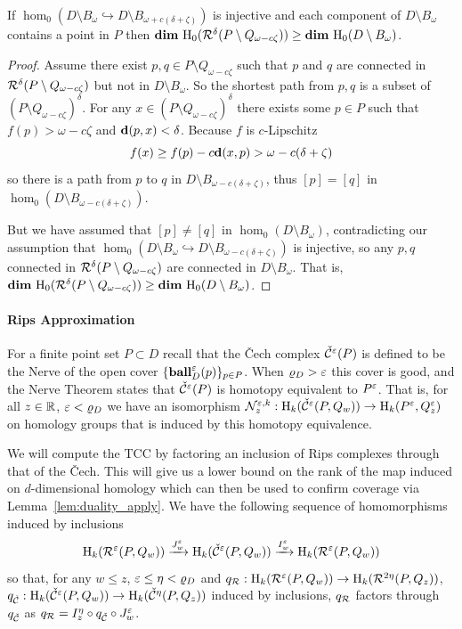 \begin{lemma}\label{lem:assumption2}
  If $\hom_0(D\setminus B_\omega\hookrightarrow D\setminus B_{\omega+c(\delta+\zeta)})$ is injective and each component of $D\setminus B_\omega$ contains a point in $P$ then $\mathbf{dim}~\mathrm{H}_0(\mathcal{R}^\delta(P\setminus Q_{\omega-c\zeta})) \geq \mathbf{dim}~\mathrm{H}_0(D\setminus B_\omega)$.
\end{lemma}
\begin{proof}
  Assume there exist $p,q \in P\setminus Q_{\omega-c\zeta}$ such that $p$ and $q$ are connected in $\mathcal{R}^\delta(P\setminus Q_{\omega-c\zeta})$ but not in $D\setminus B_\omega$.
  So the shortest path from $p, q$ is a subset of $(P\setminus Q_{\omega-c\zeta})^\delta$.
  For any $x\in (P\setminus Q_{\omega-c\zeta})^\delta$ there exists some $p\in P$ such that $f(p) > \omega - c\zeta$ and $\mathbf{d}(p,x) < \delta$.
  Because $f$ is $c$-Lipschitz
  \[ f(x)\geq f(p) - c\mathbf{d}(x,p) > \omega - c(\delta+\zeta)\]
  so there is a path from $p$ to $q$ in $D\setminus B_{\omega-c(\delta+\zeta)}$, thus $[p] = [q]$ in $\hom_0(D\setminus B_{\omega-c(\delta+\zeta)})$.

  But we have assumed that $[p]\neq[q]$ in $\hom_0(D\setminus B_\omega)$, contradicting our assumption that $\hom_0(D\setminus B_\omega\hookrightarrow D\setminus B_{\omega-c(\delta+\zeta)})$ is injective, so any $p,q$ connected in $\mathcal{R}^\delta(P\setminus Q_{\omega-c\zeta})$ are connected in $D\setminus B_\omega$.
  That is, $\mathbf{dim}~\mathrm{H}_0(\mathcal{R}^\delta(P\setminus Q_{\omega-c\zeta}))\geq \mathbf{dim}~\mathrm{H}_0(D\setminus B_\omega)$.
\end{proof}

\paragraph{Rips Approximation}

For a finite point set $P\subset D$ recall that the \v Cech complex $\check{\mathcal{C}}^\varepsilon(P)$ is defined to be the Nerve of the open cover $\{\mathbf{ball}_D^\varepsilon(p)\}_{p\in P}$.
When $\varrho_D > \varepsilon$ this cover is good, and the Nerve Theorem states that $\check{\mathcal{C}}^\varepsilon(P)$ is homotopy equivalent to $P^\varepsilon$.
That is, for all $z\in\mathbb{R}$, $\varepsilon < \varrho_D$ we have an isomorphism $\mathcal{N}_z^{\varepsilon, k} : \mathrm{H}_k(\check{\mathcal{C}}^\varepsilon(P,Q_w))\to \mathrm{H}_k(P^\varepsilon, Q_z^\varepsilon)$ on homology groups that is induced by this homotopy equivalence.

We will compute the TCC by factoring an inclusion of Rips complexes through that of the \v Cech.
This will give us a lower bound on the rank of the map induced on $d$-dimensional homology which can then be used to confirm coverage via Lemma~\ref{lem:duality_apply}.
We have the following sequence of homomorphisms induced by inclusions
\[ \mathrm{H}_k(\mathcal{R}^\varepsilon(P, Q_w))\xrightarrow{J_w^\varepsilon}\mathrm{H}_k(\check{\mathcal{C}}^\varepsilon(P, Q_w))\xrightarrow{I_w^\varepsilon}\mathrm{H}_k(\mathcal{R}^\varepsilon(P, Q_w))\]
so that, for any $w\leq z$, $\varepsilon\leq\eta < \varrho_D$ and $q_{\mathcal{R}} : \mathrm{H}_k(\mathcal{R}^\varepsilon(P, Q_w))\to \mathrm{H}_k(\mathcal{R}^{2\eta}(P, Q_z))$, $q_{\check{\mathcal{C}}} : \mathrm{H}_k(\check{\mathcal{C}}^\varepsilon(P, Q_w))\to \mathrm{H}_k(\check{\mathcal{C}}^{\eta}(P, Q_z))$ induced by inclusions, $q_{\mathcal{R}}$ factors through $q_{\check{\mathcal{C}}}$ as $q_{\mathcal{R}} = I_z^\eta\circ q_{\check{\mathcal{C}}}\circ J_w^\varepsilon$.


